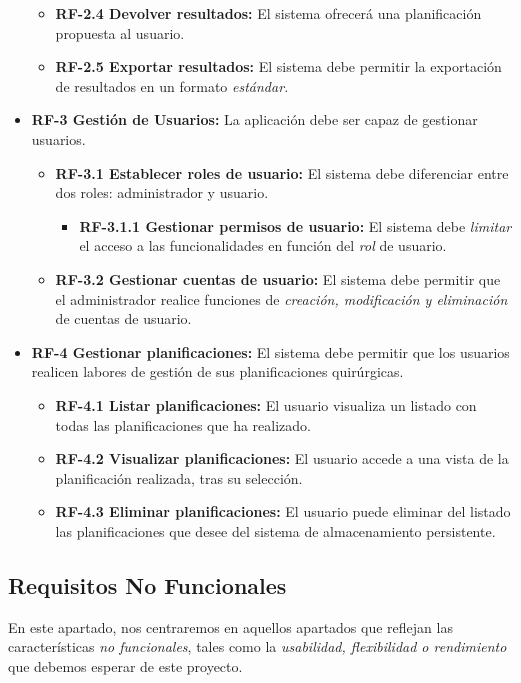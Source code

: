 \begin{itemize}
\begin{itemize}
        \item \textbf{RF-2.4 Devolver resultados:} El sistema ofrecerá una planificación propuesta al usuario.
        \item \textbf{RF-2.5 Exportar resultados:} El sistema debe permitir la exportación de resultados en un formato \textit{estándar.} 
    \end{itemize}
    \item \textbf{RF-3 Gestión de Usuarios:} La aplicación debe ser capaz de gestionar usuarios.
    \begin{itemize}
        \item \textbf{RF-3.1 Establecer roles de usuario:} El sistema debe diferenciar entre dos roles: administrador y usuario.
        \begin{itemize}
            \item \textbf{RF-3.1.1 Gestionar permisos de usuario:} El sistema debe \textit{limitar} el acceso a las funcionalidades en función del \textit{rol} de usuario.
        \end{itemize}
        \item \textbf{RF-3.2 Gestionar cuentas de usuario:} El sistema debe permitir que el administrador realice funciones de \textit{creación, modificación y eliminación} de cuentas de usuario.
    \end{itemize}
    \item \textbf{RF-4 Gestionar planificaciones:} El sistema debe permitir que los usuarios realicen labores de gestión de sus planificaciones quirúrgicas.
    \begin{itemize}
        \item \textbf{RF-4.1 Listar planificaciones:} El usuario visualiza un listado con todas las planificaciones que ha realizado.
        \item \textbf{RF-4.2 Visualizar planificaciones:} El usuario accede a una vista de la planificación realizada, tras su selección.
        \item \textbf{RF-4.3 Eliminar planificaciones:} El usuario puede eliminar del listado las planificaciones que desee del sistema de almacenamiento persistente.
    \end{itemize}
\end{itemize}


\subsection{Requisitos No Funcionales}

En este apartado, nos centraremos en aquellos apartados que reflejan las características \textit{no funcionales}, tales como la \textit{usabilidad, flexibilidad o rendimiento} que debemos esperar de este proyecto.\cite{Chung2009OnEngineering}

